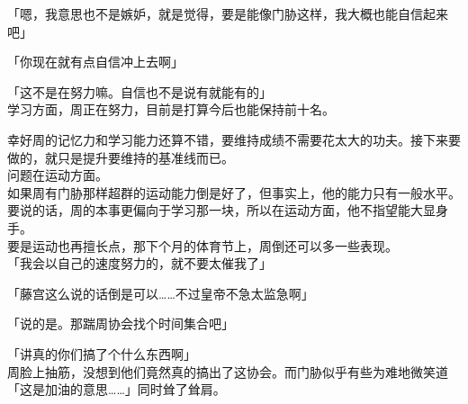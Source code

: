 「嗯，我意思也不是嫉妒，就是觉得，要是能像门胁这样，我大概也能自信起来吧」

「你现在就有点自信冲上去啊」

「这不是在努力嘛。自信也不是说有就能有的」\\

学习方面，周正在努力，目前是打算今后也能保持前十名。

幸好周的记忆力和学习能力还算不错，要维持成绩不需要花太大的功夫。接下来要做的，就只是提升要维持的基准线而已。\\

问题在运动方面。\\

如果周有门胁那样超群的运动能力倒是好了，但事实上，他的能力只有一般水平。要说的话，周的本事更偏向于学习那一块，所以在运动方面，他不指望能大显身手。\\

要是运动也再擅长点，那下个月的体育节上，周倒还可以多一些表现。\\

「我会以自己的速度努力的，就不要太催我了」

「藤宫这么说的话倒是可以……不过皇帝不急太监急啊」

「说的是。那踹周协会找个时间集合吧」

「讲真的你们搞了个什么东西啊」\\

周脸上抽筋，没想到他们竟然真的搞出了这协会。而门胁似乎有些为难地微笑道「这是加油的意思……」同时耸了耸肩。
